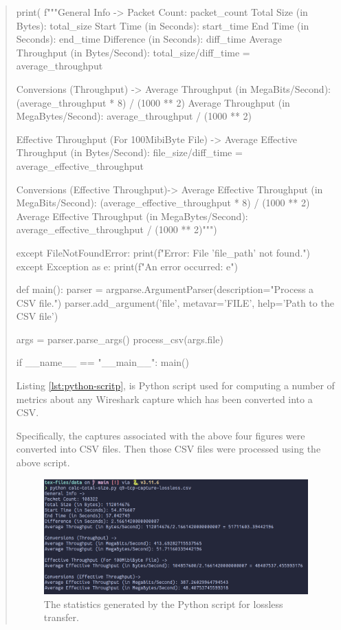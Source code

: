 \documentclass{article}
\newenvironment{ans}
   {\fbox{Answer}\begin{quote}\nopagebreak}
   {\end{quote}}
\begin{document}
\begin{ans}
\begin{gruvboxlisting}[language=Python,caption={A Python script for computing a
number of statistics about any Wireshark capture.},label={lst:python-scritp}]
        print(
f"""General Info ->
Packet Count: {packet_count}
Total Size (in Bytes): {total_size}
Start Time (in Seconds): {start_time}
End Time (in Seconds): {end_time}
Difference (in Seconds): {diff_time}
Average Throughput (in Bytes/Second): {total_size}/{diff_time} = {average_throughput}

Conversions (Throughput) ->
Average Throughput (in MegaBits/Second): {(average_throughput * 8) / (1000 ** 2)}
Average Throughput (in MegaBytes/Second): {average_throughput / (1000 ** 2)}

Effective Throughput (For 100MibiByte File) ->
Average Effective Throughput (in Bytes/Second): {file_size}/{diff_time} = {average_effective_throughput}

Conversions (Effective Throughput)-> 
Average Effective Throughput (in MegaBits/Second): {(average_effective_throughput * 8) / (1000 ** 2)}
Average Effective Throughput (in MegaBytes/Second): {average_effective_throughput / (1000 ** 2)}""")

    except FileNotFoundError:
        print(f"Error: File '{file_path}' not found.")
    except Exception as e:
        print(f"An error occurred: {e}")

def main():
    parser = argparse.ArgumentParser(description="Process a CSV file.")
    parser.add_argument('file', metavar='FILE', help='Path to the CSV file')

    args = parser.parse_args()
    process_csv(args.file)

if __name__ == "__main__":
    main()
\end{gruvboxlisting}

Listing \ref{lst:python-scritp}, is Python script used for computing a number of
metrics about any Wireshark capture which has been converted into a CSV.

Specifically, the captures associated with the above four figures were converted
into CSV files. Then those CSV files were processed using the above script.

\begin{figure}[H]
\centering
\includegraphics[width=16cm]{data/q9-stats-tcp-lossless.png}
\caption{The statistics generated by the Python script for lossless transfer.}
\end{figure}


\end{ans}
\end{document}
